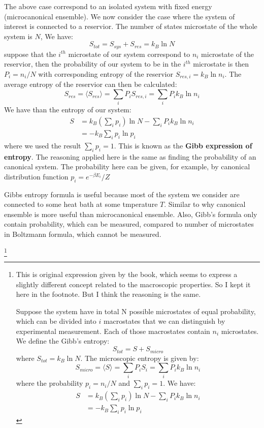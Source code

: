 \documentclass{article}
\begin{document}
The above case correspond to an isolated system with fixed energy (microcanonical ensemble). We now
consider the case where the system of interest is connected to a reservior. 
The number of states microstate of the whole system is $N$, We have:
\begin{equation}
    S_{tot} = S_{sys} + S_{res} = k_B \ln N
\end{equation}
suppose that the $i^{th}$ microstate of our system correspond to $n_i$ microstate of the reservior,
then the probability of our system to be in the $i^{th}$ microstate is then $P_i = n_i / N$
with corresponding entropy of the reservior $S_{res,i} = k_B \ln n_i$. The average entropy 
of the reservior can then be calculated:
\begin{equation}
    S_{res} = \langle S_{res} \rangle = \sum_i P_i S_{res,i} = \sum_i P_i k_B\ln n_i
\end{equation}
We have than the entropy of our system:
\begin{align}
    S & = k_B \left(\sum_i p_i\right) \ln N - \sum_i P_i k_B\ln n_i \\
    & = - k_B \sum_i p_i \ln p_i
\end{align}
where we used the result $\sum_i p_i = 1$. This is known as the \textbf{Gibb expression of entropy}.
The reasoning applied here is the same as finding the probability of an canonical system. 
The probability here can be given, for example, by canonical distribution function $p_i = e^{-\beta E_i} / Z$

Gibbs entropy formula is useful because most of the system we consider are connected to some 
heat bath at some tmperature $T$. Similar to why canonical ensemble is more useful than microcanonical 
ensemble. 
Also, Gibb's formula only contain probability, which can be measured, compared to number of microstates
in Boltzmann formula, which cannot be measured.

\footnote{
This is original expression given by the book, which seems to express a slightly different concept
related to the macroscopic properties. So I kept it here in the footnote. But I think the reasoning 
is the same.

Suppose the system 
have in total N possible microstates of equal probability, 
which can be divided into $i$ macrostates that we can distinguish by experimental measurement.
Each of those macrostates contain $n_i$ microstates. We define the Gibb's entropy:
\begin{equation}
    S_{tot} = S + S_{micro}
\end{equation}
where $ S_{tot} = k_B \ln N$. The microscopic entropy is given by:
\begin{equation}
    S_{micro} = \langle S \rangle = \sum_i P_i S_i = \sum_i P_i k_B\ln n_i
\end{equation}
where the probability $p_i = n_i / N$ and $\sum_i p_i = 1$. We have:
\begin{align}
    S & = k_B \left(\sum_i p_i\right) \ln N - \sum_i P_i k_B\ln n_i \\
    & = - k_B \sum_i p_i \ln p_i
\end{align}
}
\end{document}
